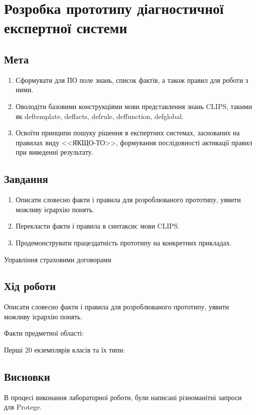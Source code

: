 



\newcommand{\labnumber}{4} %



\graphicspath{{figures/}}


\Ukrainian


\addtocounter{page}{1}

\section*{Розробка прототипу діагностичної експертної системи}
\subsection*{Мета}
\begin{enumerate}
	\item Сформувати для ПО поле знань, список фактів, а також правил для роботи з ними.
	\item Оволодіти базовими конструкціями мови представлення знань CLIPS, такими як deftemplate, deffacts, defrule, deffunction, defglobal.
	\item Освоїти принципи пошуку рішення в експертних системах, заснованих на правилах виду <<ЯКЩО-ТО>>, формування послідовності активації правил при виведенні результату.
\end{enumerate}

\subsection*{Завдання}
\begin{enumerate}
	\item Описати словесно факти і правила для розроблюваного прототипу, уявити можливу ієрархію понять. 
	\item Перекласти факти і правила в синтаксис мови CLIPS.
	\item Продемонструвати працездатність прототипу на конкретних прикладах.
\end{enumerate}

\begin{center}
Управління страховими договорами
\end{center}

\subsection*{Хід роботи}
Описати словесно факти і правила для розроблюваного прототипу, уявити можливу ієрархію понять.

Факти предметної області:


Перші 20 екземплярів класів та їх типи:

\subsection*{Висновки}
В процесі виконання лабораторної роботи, були написані різноманітні запроси для Protege.


